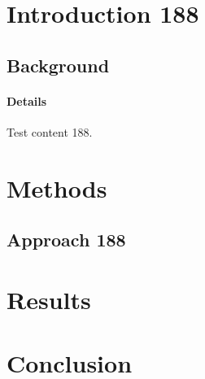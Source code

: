 \documentclass{article}
\begin{document}
\section{Introduction 188}
\subsection{Background}
\paragraph{Details} Test content 188.
\section{Methods}
\subsection{Approach 188}
\section{Results}
\section{Conclusion}
\end{document}
